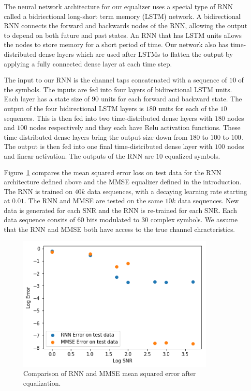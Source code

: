 The neural network architecture for our equalizer uses a special type of RNN called a bidriectional long-short term memory (LSTM) network.  
A bidirectional RNN connects the forward and backwards nodes of the RNN, allowing the output to depend on both future and past states.
An RNN that has LSTM units allows the nodes to store memory for a short period of time.
Our network also has time-distributed dense layers which are used after LSTMs to flatten the output by applying a fully connected dense layer at each time step.

The input to our RNN is the channel taps concatenated with a sequence of $10$ of the symbols.  The inputs are fed into four layers of bidirectional LSTM units.  Each layer has a state size of $90$ units for each forward and backward state.  The output of the four bidirectional LSTM layers is $180$ units for each of the $10$ sequences.  
This is then fed into two time-distributed dense layers with $180$ nodes and $100$ nodes respectively and they each have Relu activation functions. These time-distributed dense layers bring the output size down from $180$ to $100$ to $100$.  The output is then fed into one final time-distributed dense layer with $100$ nodes and linear activation.  The outputs of the RNN are $10$ equalized symbols.  


Figure~\ref{fig:rnn_vs_mmse} compares the mean squared error loss on test data for the RNN architecture defined above and the MMSE equalizer defined in the introduction.  
The RNN is trained on $40k$ data sequences, with a decaying learning rate starting at $0.01$.
The RNN and MMSE are tested on the same $10k$ data sequences.  New data is generated for each SNR and the RNN is re-trained for each SNR.  Each data sequence consits of $60$ bits modulated to $30$ complex symbols.
We assume that the RNN and MMSE both have access to the true channel chracteristics.

\begin{figure}
\begin{center}
\includegraphics[width=100mm]{figures/equal/RNN_vs_MMSE.png}
\caption{Comparison of RNN and MMSE mean squared error after equalization.}
\label{fig:rnn_vs_mmse}
\end{center}
\end{figure}

